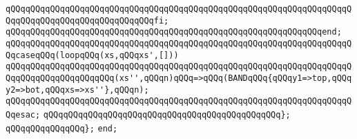 \verb|qQQqqQQqqQQqqQQqqQQqqQQqqQQqqQQqqQQqqQQqqQQqqQQqqQQqqQQqqQQqqQQqqQQqqQQqqQQqqQQqqQQqqQQqqQQqqQQqqQQqfi;|\newline
\verb|qQQqqQQqqQQqqQQqqQQqqQQqqQQqqQQqqQQqqQQqqQQqqQQqqQQqqQQqqQQqqQQqend;|\newline
\newline
\verb|qQQqqQQqqQQqqQQqqQQqqQQqqQQqqQQqqQQqqQQqqQQqqQQqqQQqqQQqqQQqqQQqqQQqqQQqcaseqQQq(loopqQQq(xs,qQQqxs',[]))|\newline
\newline
\verb|qQQqqQQqqQQqqQQqqQQqqQQqqQQqqQQqqQQqqQQqqQQqqQQqqQQqqQQqqQQqqQQqqQQqqQQqqQQqqQQqqQQqqQQqqQQq(xs'',qQQqn)qQQq=>qQQq(BANDqQQq{qQQqy1=>top,qQQqy2=>bot,qQQqxs=>xs''},qQQqn);|\newline
\verb|qQQqqQQqqQQqqQQqqQQqqQQqqQQqqQQqqQQqqQQqqQQqqQQqqQQqqQQqqQQqqQQqqQQqqQQqesac;|\newline
\verb|qQQqqQQqqQQqqQQqqQQqqQQqqQQqqQQqqQQqqQQqqQQqqQQq};|\newline
\verb|qQQqqQQqqQQqqQQq};|\newline
\verb|end;|\newline
\newline

